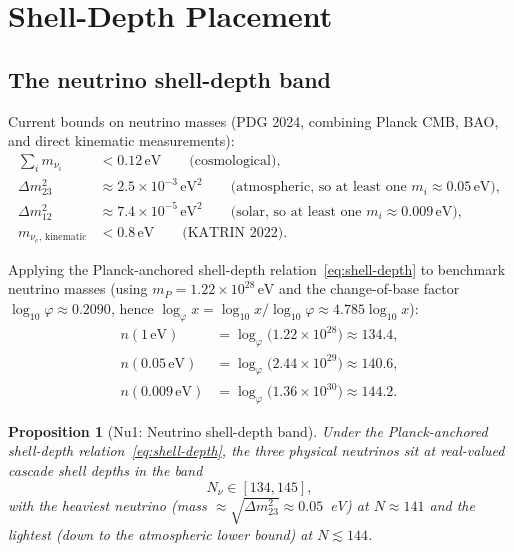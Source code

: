 \documentclass[12pt]{article}
\newtheorem{proposition}[theorem]{Proposition}
\theoremstyle{definition}
\theoremstyle{remark}
\begin{document}
\section{Shell-Depth Placement}\label{sec:shells}

\subsection{The neutrino shell-depth band}

Current bounds on neutrino masses (PDG 2024, combining Planck CMB, BAO, and direct kinematic measurements):
\begin{align}
\sum_i m_{\nu_i} &< 0.12\,\mathrm{eV} \qquad \text{(cosmological)},\\
\Delta m^2_{23} &\approx 2.5 \times 10^{-3}\,\mathrm{eV}^2 \qquad \text{(atmospheric, so at least one } m_i \approx 0.05\,\mathrm{eV}\text{)},\\
\Delta m^2_{12} &\approx 7.4 \times 10^{-5}\,\mathrm{eV}^2 \qquad \text{(solar, so at least one } m_i \approx 0.009\,\mathrm{eV}\text{)},\\
m_{\nu_e,\,\mathrm{kinematic}} &< 0.8\,\mathrm{eV} \qquad \text{(KATRIN 2022)}.
\end{align}

Applying the Planck-anchored shell-depth relation~\eqref{eq:shell-depth} to benchmark neutrino masses (using $m_P = 1.22 \times 10^{28}\,\mathrm{eV}$ and the change-of-base factor $\log_{10} \varphi \approx 0.2090$, hence $\log_\varphi x = \log_{10} x / \log_{10} \varphi \approx 4.785 \log_{10} x$):
\begin{align}
n(1\,\mathrm{eV}) &= \log_\varphi\bigl(1.22 \times 10^{28}\bigr) \approx 134.4,\\
n(0.05\,\mathrm{eV}) &= \log_\varphi\bigl(2.44 \times 10^{29}\bigr) \approx 140.6,\\
n(0.009\,\mathrm{eV}) &= \log_\varphi\bigl(1.36 \times 10^{30}\bigr) \approx 144.2.
\end{align}

\begin{proposition}[Nu1: Neutrino shell-depth band]\label{prop:shell-band}
Under the Planck-anchored shell-depth relation~\eqref{eq:shell-depth}, the three physical neutrinos sit at real-valued cascade shell depths in the band
\begin{equation}\label{eq:shell-band}
N_\nu \in [134, 145],
\end{equation}
with the heaviest neutrino (mass $\approx \sqrt{\Delta m^2_{23}} \approx 0.05$~eV) at $N \approx 141$ and the lightest (down to the atmospheric lower bound) at $N \lesssim 144$.
\end{proposition}
\end{document}

